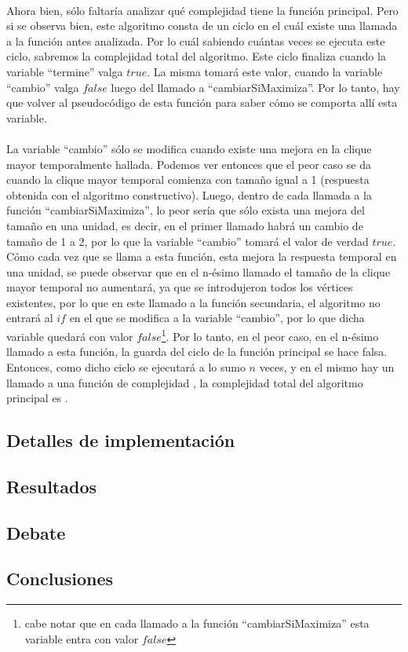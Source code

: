 \paragraph{}
Ahora bien, sólo faltaría analizar qué complejidad tiene la función principal. Pero si se observa bien, este algoritmo consta de un ciclo en el cuál existe una llamada a la función antes analizada. Por lo cuál sabiendo cuántas veces se ejecuta este ciclo, sabremos la complejidad total del algoritmo. Este ciclo finaliza cuando la variable ``termine'' valga $true$. La misma tomará este valor, cuando la variable ``cambio'' valga $false$ luego del llamado a ``cambiarSiMaximiza''. Por lo tanto, hay que volver al pseudocódigo de esta función para saber cómo se comporta allí esta variable.

\paragraph{}
La variable ``cambio'' sólo se modifica cuando existe una mejora en la clique mayor temporalmente hallada. Podemos ver entonces que el peor caso se da cuando la clique mayor temporal comienza con tamaño igual a 1 (respuesta obtenida con el algoritmo constructivo). Luego, dentro de cada llamada a la función ``cambiarSiMaximiza'', lo peor sería que sólo exista una mejora del tamaño en una unidad, es decir, en el primer llamado habrá un cambio de tamaño de 1 a 2, por lo que la variable ``cambio'' tomará el valor de verdad $true$. Cómo cada vez que se llama a esta función, esta mejora la respuesta temporal en una unidad, se puede observar que en el n-ésimo llamado el tamaño de la clique mayor temporal no aumentará, ya que se introdujeron todos los vértices existentes, por lo que en este llamado a la función secundaria, el algoritmo no entrará al $if$ en el que se modifica a la variable ``cambio'', por lo que dicha variable quedará con valor $false$\footnote{cabe notar que en cada llamado a la función ``cambiarSiMaximiza'' esta variable entra con valor $false$}. Por lo tanto, en el peor caso, en el n-ésimo llamado a esta función, la guarda del ciclo de la función principal se hace falsa. Entonces, como dicho ciclo se ejecutará a lo sumo $n$ veces, y en el mismo hay un llamado a una función de complejidad , la complejidad total del algoritmo principal es .



\subsection{Detalles de implementación}
\subsection{Resultados}
\subsection{Debate}
\subsection{Conclusiones}
